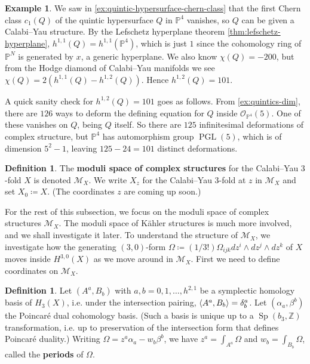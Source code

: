 \documentclass{report}
\theoremstyle{plain}
\theoremstyle{definition}
\newtheorem{definition}[theorem]{Definition}
\newtheorem{example}[theorem]{Example}
\theoremstyle{remark}
\newcommand{\bP}{\mathbb{P}}
\newcommand{\bZ}{\mathbb{Z}}
\newcommand{\cM}{\mathcal{M}}
\newcommand{\cO}{\mathcal{O}}
\DeclareMathOperator{\PGL}{PGL}
\DeclareMathOperator{\Sp}{Sp}
\DeclarePairedDelimiter{\inner}{\langle}{\rangle}
\begin{document}
\begin{example} \label{ex:quintic-hypersurface-hodge-numbers}
  We saw in \ref{ex:quintic-hypersurface-chern-class} that the first
  Chern class $c_1(Q)$ of the quintic hypersurface $Q$ in $\bP^4$
  vanishes, so $Q$ can be given a Calabi--Yau structure. By the
  Lefschetz hyperplane theorem \ref{thm:lefschetz-hyperplane},
  $h^{1,1}(Q) = h^{1,1}(\bP^4)$, which is just $1$ since the
  cohomology ring of $\bP^N$ is generated by $x$, a generic
  hyperplane. We also know $\chi(Q) = -200$, but from the Hodge
  diamond of Calabi--Yau manifolds we see $\chi(Q) = 2(h^{1,1}(Q) -
  h^{1,2}(Q))$. Hence $h^{1,2}(Q) = 101$.

  A quick sanity check for $h^{1,2}(Q) = 101$ goes as follows. From
  \ref{ex:quintics-dim}, there are $126$ ways to deform the defining
  equation for $Q$ inside $\cO_{\bP^4}(5)$. One of these vanishes on
  $Q$, being $Q$ itself. So there are $125$ infinitesimal deformations
  of complex structure, but $\bP^4$ has automorphism group $\PGL(5)$,
  which is of dimension $5^2 - 1$, leaving $125 - 24 = 101$ distinct
  deformations.
\end{example}

\begin{definition}
  The {\bf moduli space of complex structures} for the Calabi--Yau
  $3$-fold $X$ is denoted $\cM_X$. We write $X_z$ for the Calabi--Yau
  $3$-fold at $z$ in $\cM_X$ and set $X_0 \coloneqq X$. (The
  coordinates $z$ are coming up soon.)
\end{definition}

For the rest of this subsection, we focus on the moduli space of
complex structures $\cM_X$. The moduli space of K\"ahler structures is
much more involved, and we shall investigate it later. To understand
the structure of $\cM_X$, we investigate how the generating
$(3,0)$-form $\Omega \coloneqq (1/3!)\Omega_{ijk} dz^i \wedge dz^j
\wedge dz^k$ of $X$ moves inside $H^{3,0}(X)$ as we move around in
$\cM_X$. First we need to define coordinates on $\cM_X$.

\begin{definition}
  Let $(A^a, B_b)$ with $a, b = 0, 1, \ldots, h^{2,1}$ be a symplectic
  homology basis of $H_3(X)$, i.e. under the intersection pairing,
  $\inner{A^a, B_b} = \delta^a_b$. Let $(\alpha_a, \beta^b)$ the
  Poincar\'e dual cohomology basis. (Such a basis is unique up to a
  $\Sp(b_3, \bZ)$ transformation, i.e. up to preservation of the
  intersection form that defines Poincar\'e duality.) Writing $\Omega
  = z^a \alpha_a - w_b \beta^b$, we have $z^a = \int_{A^a} \Omega$ and
  $w_b = \int_{B_b} \Omega$, called the {\bf periods} of $\Omega$.
\end{definition}
\end{document}
